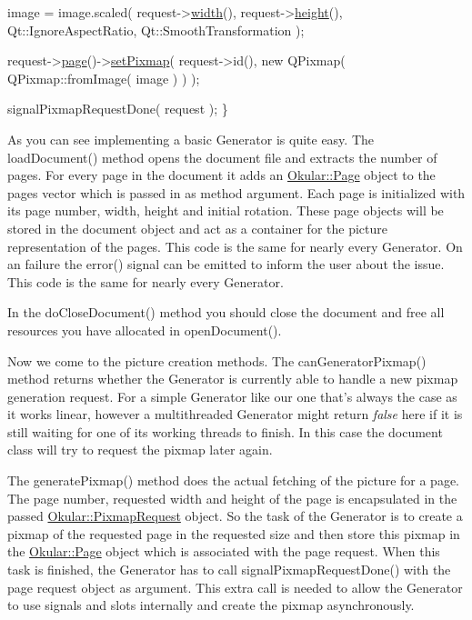 \begin{DoxyCode}
    image = image.scaled( request->\hyperlink{classOkular_1_1PixmapRequest_a3e82f09b91a52efed7435eeb9903e5fc}{width}(), request->\hyperlink{classOkular_1_1PixmapRequest_a782392a2efc6303994c7e0158c76ee06}{height}(), Qt::IgnoreAspectRatio, 
      Qt::SmoothTransformation );

    request->\hyperlink{classOkular_1_1PixmapRequest_a83b5e81f2e908e70f3c19a0a3c07fab3}{page}()->\hyperlink{classOkular_1_1Page_ae7e45a6647904b01ebe84930b73f1d79}{setPixmap}( request->id(), \textcolor{keyword}{new} QPixmap( QPixmap::fromImage( image ) ) );

    signalPixmapRequestDone( request );
\}
\end{DoxyCode}


As you can see implementing a basic Generator is quite easy. The load\+Document() method opens the document file and extracts the number of pages. For every page in the document it adds an \hyperlink{classOkular_1_1Page}{Okular\+::\+Page} object to the pages vector which is passed in as method argument. Each page is initialized with its page number, width, height and initial rotation. These page objects will be stored in the document object and act as a container for the picture representation of the pages. This code is the same for nearly every Generator. On an failure the error() signal can be emitted to inform the user about the issue. This code is the same for nearly every Generator.

In the do\+Close\+Document() method you should close the document and free all resources you have allocated in open\+Document().

Now we come to the picture creation methods. The can\+Generator\+Pixmap() method returns whether the Generator is currently able to handle a new pixmap generation request. For a simple Generator like our one that's always the case as it works linear, however a multithreaded Generator might return {\itshape false} here if it is still waiting for one of its working threads to finish. In this case the document class will try to request the pixmap later again.

The generate\+Pixmap() method does the actual fetching of the picture for a page. The page number, requested width and height of the page is encapsulated in the passed \hyperlink{classOkular_1_1PixmapRequest}{Okular\+::\+Pixmap\+Request} object. So the task of the Generator is to create a pixmap of the requested page in the requested size and then store this pixmap in the \hyperlink{classOkular_1_1Page}{Okular\+::\+Page} object which is associated with the page request. When this task is finished, the Generator has to call signal\+Pixmap\+Request\+Done() with the page request object as argument. This extra call is needed to allow the Generator to use signals and slots internally and create the pixmap asynchronously.

